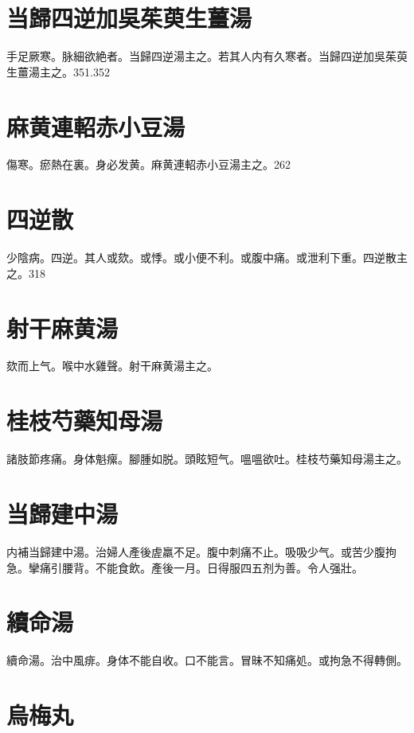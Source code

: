 \documentclass[12pt,twoside,UTF8,b5paper]{ctexbook}
\begin{document}
\section{当歸四逆加吳茱萸生薑湯}

手足厥寒。脉細欲絶者。当歸四逆湯主之。若其人内有久寒者。当歸四逆加吳茱萸生薑湯主之。351.352

\section{麻黄連軺赤小豆湯}

傷寒。瘀熱在裏。身必发黄。麻黄連軺赤小豆湯主之。262

\section{四逆散}

少陰病。四逆。其人或欬。或悸。或小便不利。或腹中痛。或泄利下重。四逆散主之。318

\section{射干麻黄湯}

欬而上气。喉中水雞聲。射干麻黄湯主之。

\section{桂枝芍藥知母湯}

諸肢節疼痛。身体魁瘰。腳腫如脱。頭眩短气。嗢嗢欲吐。桂枝芍藥知母湯主之。

\section{当歸建中湯}

内補当歸建中湯。治婦人產後虗羸不足。腹中刺痛不止。吸吸少气。或苦少腹拘急。攣痛引腰背。不能食飲。產後一月。日得服四五剂为善。令人强壯。

\section{續命湯}

續命湯。治中風痱。身体不能自收。口不能言。冒昧不知痛処。或拘急不得轉側。

\section{烏梅丸}
\end{document}

